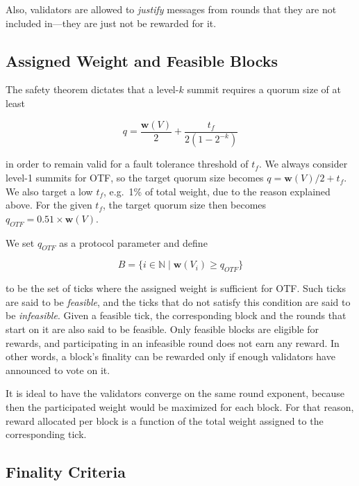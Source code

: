 Also, validators are allowed to \emph{justify} messages from rounds that they are not included in---they are just not be rewarded for it.

\subsection{Assigned Weight and Feasible Blocks}
\label{sec:assigned-weight-and-feasible-blocks}

The safety theorem dictates that a level-$k$ summit requires a quorum size of at least

\begin{equation}
q = \frac{\boldsymbol{w}(V)}{2} + \frac{t_f}{2(1-2^{-k})}
\end{equation}

in order to remain valid for a fault tolerance threshold of $t_f$. We always consider level-1 summits for OTF, so the target quorum size becomes $q=\boldsymbol{w}(V)/2+t_f$. We also target a low $t_f$, e.g.~1\% of total weight, due to the reason explained above. For the given $t_f$, the target quorum size then becomes $q_{OTF} = 0.51 \times \boldsymbol{w}(V)$.

We set $q_{OTF}$ as a protocol parameter and define

\begin{equation}
B=\{i\in \mathbb{N} \mid \boldsymbol{w}(V_i)\geq q_{OTF}\}
\end{equation}

to be the set of ticks where the assigned weight is sufficient for OTF. Such ticks are said to be \emph{feasible}, and the ticks that do not satisfy this condition are said to be \emph{infeasible}. Given a feasible tick, the corresponding block and the rounds that start on it are also said to be feasible. Only feasible blocks are eligible for rewards, and participating in an infeasible round does not earn any reward. In other words, a block's finality can be rewarded only if enough validators have announced to vote on it.

It is ideal to have the validators converge on the same round exponent, because then the participated weight would be maximized for each block. For that reason, reward allocated per block is a function of the total weight assigned to the corresponding tick.

\subsection{Finality Criteria}
\label{sec:finality-criteria}

